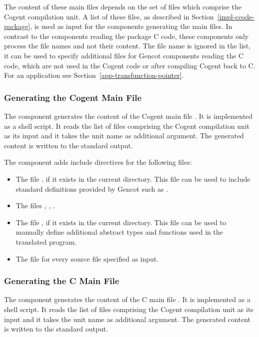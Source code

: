 The content of these main files depends on the set of  files which comprise the Cogent compilation unit.
A list of these files, as described in Section~\ref{impl-ccode-package}, is used as input for the components generating
the main files. In contrast to the components reading the package C code, these components only process the file 
names and not their content. The file name  is ignored in the list, it can be used
to specify additional  files for Gencot components reading the C code, which are not used in the Cogent 
code or after compiling Cogent back to C. For an application see Section~\ref{app-transfunction-pointer}.

\subsubsection{Generating the Cogent Main File}

The component  generates the content of the Cogent main file . 
It is implemented as a shell script. It reads the list of
 files comprising the Cogent compilation unit as its input and it takes the unit name 
as additional argument. The generated content is written to the standard output. 

The component adds include directives for the following files:
\begin{itemize}
\item The file , if it exists in the current directory. This file can be used to include standard 
definitions provided by Gencot such as .
\item The files , , .
\item The file , if it exists in the current directory. This file can be used to
manually define additional abstract types and functions used in the translated program.
\item The file  for every source file  specified as input.
\end{itemize}

\subsubsection{Generating the C Main File}

The component  generates the content of the C main file . 
It is implemented as a shell script. It reads the list of
 files comprising the Cogent compilation unit as its input and it takes the unit name 
as additional argument. The generated content is written to the standard output. 

